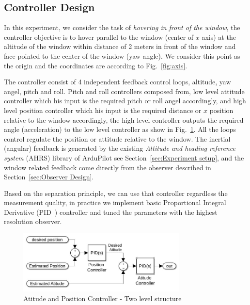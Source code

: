 \documentclass{sig-alternate-ipsn13}
\begin{document}
\subsection{Controller Design}

In this experiment, we consider the task of \textit{hovering in front of the window}, the controller objective is to hover parallel to the window (center of $x$ axis) at the altitude of the window within distance of 2 meters in front of the window and face pointed to the center of the window (yaw angle).
We consider this point as the origin and the coordinates are according to Fig.~\ref{fig:axis}.

The controller consist of 4 independent feedback control loops, altitude, yaw angel, pitch and roll.
Pitch and roll controllers composed from, low level attitude controller which his input is the required pitch or roll angel accordingly, and high level position controller which his input is the required distance or $x$ position relative to the window accordingly, the high level controller outputs the required angle (acceleration) to the low level controller as show in Fig.~\ref{fig:controllerStracture}.
All the loops control regulate the position or attitude relative to the window.
The inertial (angular) feedback is generated by the existing \textit{Attitude and heading reference system} (AHRS) library of ArduPilot see Section~\ref{sec:Experiment setup}, and the window related feedback come directly from the observer described in Section~\ref{sec:Observer Design}.

Based on the separation principle, we can use that controller regardless the measurement quality, in practice we implement basic Proportional Integral Derivative (PID~\cite{aastrom2006advanced}) controller and tuned the parameters with the highest resolution observer.

\begin{figure}[htbp]
    \centerline{\includegraphics[width=85mm]{two_level_controller.jpg}}
    \caption{Atitude and Position Controller - Two level structure}
    \label{fig:controllerStracture}
\end{figure}
\end{document}
